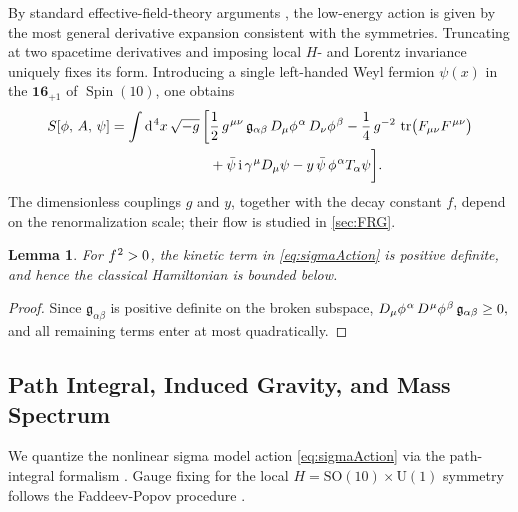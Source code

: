 \documentclass[pdflatex,sn-mathphys-num]{sn-jnl}
\theoremstyle{thmstyleone}
\newtheorem{lemma}{Lemma}
\theoremstyle{thmstyletwo}%
\theoremstyle{thmstylethree}%
\newcommand{\SO}[1]{\mathrm{SO(#1)}}
\newcommand{\U}[1]{\mathrm{U(#1)}}
\newcommand{\SOTen}{\SO{10}}
\newcommand{\UOne}{\U{1}}
\newcommand{\SOTenXUOne}{\SOTen \times \UOne}
\newcommand{\tr}{\operatorname{tr}}
\newcommand{\sm}{\hspace{.065em}}
\newcommand{\Spin}{\operatorname{Spin}}
\newcommand{\smexp}[1]{^{\sm #1}}
\newcommand{\dv}[1]{\mathrm{d}\smexp{#1}}
\begin{document}
By standard effective-field-theory arguments \cite{CWZ69,Weinberg:1996kr}, the low-energy action is given by the most general derivative expansion consistent with the symmetries.  Truncating at two spacetime derivatives and imposing local \(H\)- and Lorentz invariance uniquely fixes its form.  Introducing a single left-handed Weyl fermion \(\psi(x)\) in the \(\mathbf{16}_{+1}\) of \(\Spin(10)\), one obtains
\begin{equation}\label{eq:sigmaAction}
\begin{aligned}
  S[\phi,\,A,\,\psi]
  = \int \dv{4}x\,\sqrt{-g}\,\biggl[
    & \frac12\,g\smexp{\mu\nu}\,\mathfrak g_{\alpha\beta}\,
      D_{\mu}\phi\smexp{\alpha}\,D_{\nu}\phi\smexp{\beta}
    -\frac14\,g^{-2}\,\tr\bigl(F_{\mu\nu}F\smexp{\mu\nu}\bigr)\\
    & + \bar\psi\,\mathrm i\,\gamma\smexp{\mu}D_{\mu}\psi
    -y\,\bar\psi\,\phi\smexp{\alpha}T_{\alpha}\psi
  \biggr].
\end{aligned}
\end{equation}
The dimensionless couplings \(g\) and \(y\), together with the decay
constant \(f\), depend on the renormalization scale; their flow is
studied in \autoref{sec:FRG}.

\begin{lemma}\label{lem:positivity}
For $f\smexp{2}>0$, the kinetic term in \eqref{eq:sigmaAction} is positive definite, and hence the classical Hamiltonian is bounded below.
\end{lemma}

\begin{proof}
Since $\mathfrak g_{\alpha\beta}$ is positive definite on the broken subspace, 
\(
  D_\mu\phi\smexp{\alpha}\,D\smexp\mu\phi\smexp{\beta}\,\mathfrak g_{\alpha\beta}\ge 0,
\)
and all remaining terms enter at most quadratically.  
\end{proof}

\subsection{Path Integral, Induced Gravity, and Mass Spectrum}
\label{subsec:quantization}

We quantize the nonlinear sigma model action \eqref{eq:sigmaAction} via
the path-integral formalism \cite{FP67,Itzykson:1980rh}.
Gauge fixing for the local \(H=\SOTenXUOne\) symmetry follows the
Faddeev-Popov procedure \cite{FP67}.
\end{document}
